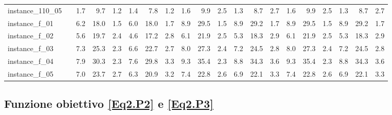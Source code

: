 \documentclass[12pt,a4paper,openright,twoside]{book}
\begin{document}
\begin{table}[H]
{\begin{tabular}{|ll|rrrrrr|rrrrrr|rrrrrr|}
instance\_110\_05             &     &    1.7  &   9.7  &  1.2  &   1.4  &   7.8  &  1.2   &     1.6  &   9.9  &  2.5  &   1.3  &   8.7  &  2.7   &   1.6  &   9.9  &  2.5  &   1.3  &   8.7  &  2.7 \\  
instance\_f\_01               &     &   6.2  &   18.0  &  1.5  &   6.0  &   18.0  &  1.7  &    8.9  &   29.5  &  1.5  &   8.9  &   29.2  &  1.7 &   8.9  &   29.5  &  1.5  &   8.9  &   29.2  &  1.7\\  
instance\_f\_02               &     &    5.6  &   19.7  &  2.4  &   4.6  &   17.2  &  2.8  &    6.1  &   21.9  &  2.5  &   5.3  &   18.3  &  2.9  &   6.1  &   21.9  &  2.5  &   5.3  &   18.3  &  2.9\\   
instance\_f\_03               &     &   7.3  &   25.3  &  2.3  &   6.6  &   22.7  &  2.7   &   8.0  &   27.3  &  2.4  &   7.2  &   24.5  &  2.8 &   8.0  &   27.3  &  2.4  &   7.2  &   24.5  &  2.8\\   
instance\_f\_04               &     &    7.9  &   30.3  &  2.3  &   7.6  &   29.8  &  3.3  &    9.3  &   35.4  &  2.3  &   8.8  &   34.3  &  3.6  &   9.3  &   35.4  &  2.3  &   8.8  &   34.3  &  3.6\\   
instance\_f\_05               &     &   7.0  &   23.7  &  2.7  &   6.3  &   20.9  &  3.2   &   7.4  &   22.8  &  2.6  &   6.9  &   22.1  &  3.3 &   7.4  &   22.8  &  2.6  &   6.9  &   22.1  &  3.3\\ 
 \hline
\end{tabular}
}
\end{table}

\subsection{Funzione obiettivo \texorpdfstring{\eqref{Eq2.P2}}{(5.24)} e \texorpdfstring{\eqref{Eq2.P3}}{(5.25)}}
\end{document}
